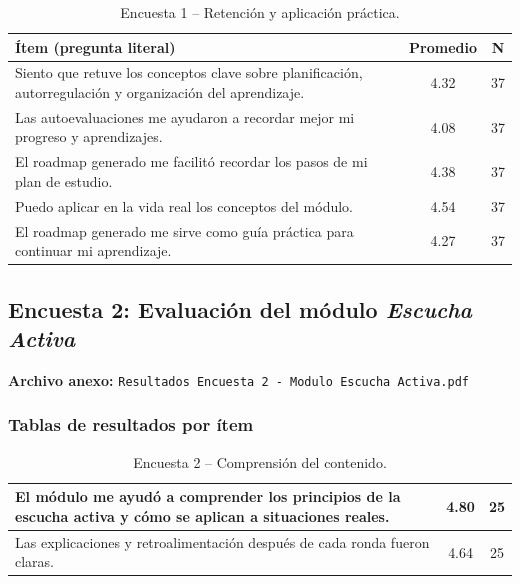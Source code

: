 \begin{table}[H]
\centering
\footnotesize
\setlength{\tabcolsep}{4pt}
\renewcommand{\arraystretch}{1.35}
\begin{tabular}{|p{10.5cm}|c|c|}
\hline
\textbf{Ítem (pregunta literal)} & \textbf{Promedio} & \textbf{N} \\
\hline
Siento que retuve los conceptos clave sobre planificación, autorregulación y organización del aprendizaje. & 4.32 & 37 \\
\hline
Las autoevaluaciones me ayudaron a recordar mejor mi progreso y aprendizajes. & 4.08 & 37 \\
\hline
El roadmap generado me facilitó recordar los pasos de mi plan de estudio. & 4.38 & 37 \\
\hline
Puedo aplicar en la vida real los conceptos del módulo. & 4.54 & 37 \\
\hline
El roadmap generado me sirve como guía práctica para continuar mi aprendizaje. & 4.27 & 37 \\
\hline
\end{tabular}
\caption{Encuesta 1 – Retención y aplicación práctica.}
\label{tab:anexo-aaa-aplicacion}
\end{table}

\subsection*{Encuesta 2: Evaluación del módulo \textit{Escucha Activa}}

\vspace{0.2cm}
\noindent\textbf{Archivo anexo:}  
\texttt{Resultados Encuesta 2 - Modulo Escucha Activa.pdf}

\vspace{0.5cm}

\subsubsection*{Tablas de resultados por ítem}

\begin{table}[H]
\centering
\footnotesize
\setlength{\tabcolsep}{4pt}
\renewcommand{\arraystretch}{1.35}
\begin{tabular}{|p{10.5cm}|c|c|}
\hline
El módulo me ayudó a comprender los principios de la escucha activa y cómo se aplican a situaciones reales. & 4.80 & 25 \\
\hline
Las explicaciones y retroalimentación después de cada ronda fueron claras. & 4.64 & 25 \\
\hline
\end{tabular}
\caption{Encuesta 2 – Comprensión del contenido.}
\label{tab:anexo-ea-comprension}
\end{table}

